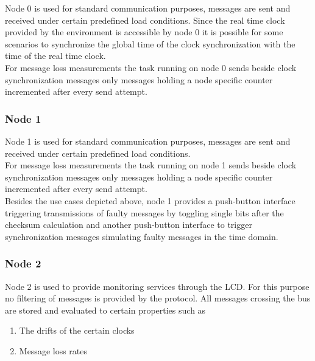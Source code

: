 Node 0 is used for standard communication purposes, messages are sent and received under certain predefined load conditions. Since the real time clock provided by the environment is
accessible by node 0 it is possible for some scenarios to synchronize the global time of the clock synchronization with the time of the real time clock.\\

For message loss measurements the task running on node 0 sends beside clock synchronization messages only messages holding a node specific counter incremented after every send attempt.\\ 

\subsubsection{Node 1}
\label{sec:app:specification:node1}

Node 1 is used for standard communication purposes, messages are sent and received under certain predefined load conditions.\\

For message loss measurements the task running on node 1 sends beside clock synchronization messages only messages holding 
a node specific counter incremented after every send attempt.\\ 

Besides the use cases depicted above, node 1 provides a push-button interface triggering transmissions of faulty messages 
by toggling single bits after the checksum calculation and another push-button interface to trigger synchronization messages 
simulating faulty messages in the time domain.\\

\subsubsection{Node 2}
\label{sec:app:specification:node2}

Node 2 is used to provide monitoring services through the LCD. For this purpose no filtering of messages is provided by the protocol.
All messages crossing the bus are stored and evaluated to certain properties such as

\begin{enumerate}
 \item The drifts of the certain clocks
 \item Message loss rates
\end{enumerate}

